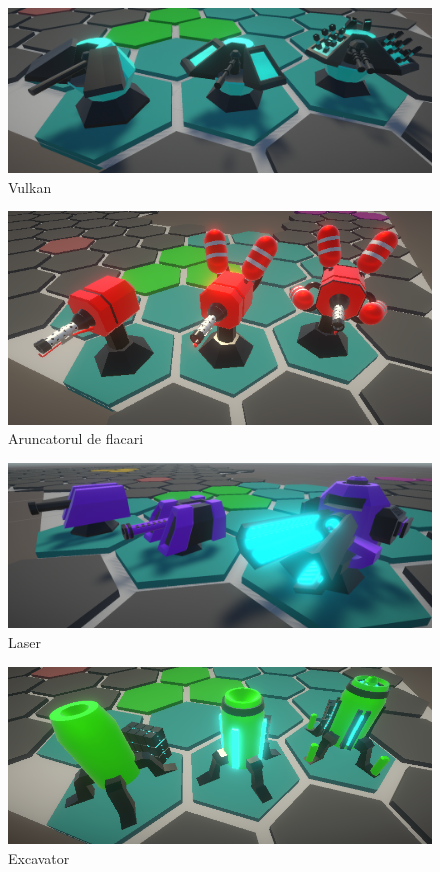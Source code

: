 \documentclass[12pt, a4paper]{article}
\begin{document}
	\begin{figure}[H]
		\centering
		\includegraphics[width=1\textwidth]{vulkan.png}
		\caption{Vulkan}
		\label{fig: vulkan}
	\end{figure}

	\begin{figure}[H]
		\centering
		\includegraphics[width=1\textwidth]{Flamethrower.png}
		\caption{Aruncatorul de flacari}
		\label{fig: machineCannon}
	\end{figure}
	
	\begin{figure}[H]
		\centering
		\includegraphics[width=1\textwidth]{railgun.png}
		\caption{Laser}
		\label{fig: railgun}
	\end{figure}

	\begin{figure}[H]
		\centering
		\includegraphics[width=1\textwidth]{Excavator.png}
		\caption{Excavator}
		\label{fig: excavator}
	\end{figure}
	
\end{document}
